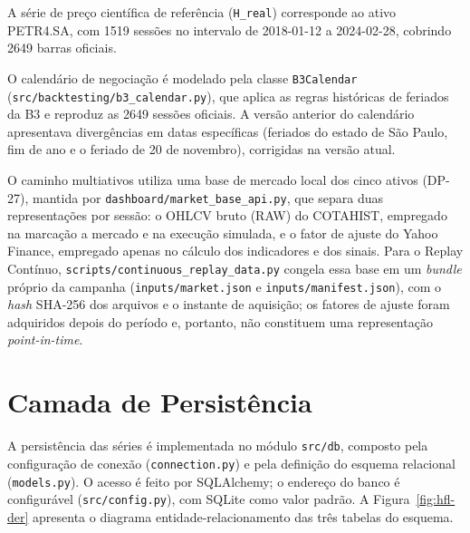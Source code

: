 A série de preço científica de referência (\texttt{H\_real}) corresponde ao ativo PETR4.SA, com 1519 sessões no intervalo de 2018-01-12 a 2024-02-28, cobrindo 2649 barras oficiais.

O calendário de negociação é modelado pela classe \texttt{B3Calendar} (\texttt{src/backtesting/b3\_calendar.py}), que aplica as regras históricas de feriados da B3 e reproduz as 2649 sessões oficiais. A versão anterior do calendário apresentava divergências em datas específicas (feriados do estado de São Paulo, fim de ano e o feriado de 20 de novembro), corrigidas na versão atual.

O caminho multiativos utiliza uma base de mercado local dos cinco ativos (DP-27), mantida por \texttt{dashboard/market\_base\_api.py}, que separa duas representações por sessão: o OHLCV bruto (RAW) do COTAHIST, empregado na marcação a mercado e na execução simulada, e o fator de ajuste do Yahoo Finance, empregado apenas no cálculo dos indicadores e dos sinais. Para o Replay Contínuo, \texttt{scripts/continuous\_replay\_data.py} congela essa base em um \textit{bundle} próprio da campanha (\texttt{inputs/market.json} e \texttt{inputs/manifest.json}), com o \textit{hash} SHA-256 dos arquivos e o instante de aquisição; os fatores de ajuste foram adquiridos depois do período e, portanto, não constituem uma representação \textit{point-in-time}.

\section{Camada de Persistência}

A persistência das séries é implementada no módulo \texttt{src/db}, composto pela configuração de conexão (\texttt{connection.py}) e pela definição do esquema relacional (\texttt{models.py}). O acesso é feito por SQLAlchemy; o endereço do banco é configurável (\texttt{src/config.py}), com SQLite como valor padrão. A Figura~\ref{fig:hfl-der} apresenta o diagrama entidade-relacionamento das três tabelas do esquema.

